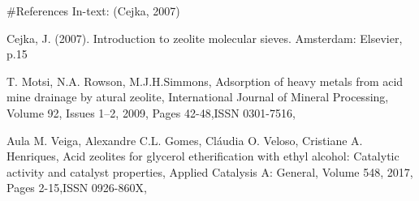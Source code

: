 \documentclass[]{article}
\begin{document}
\#References In-text: (Cejka, 2007)

Cejka, J. (2007). Introduction to zeolite molecular sieves. Amsterdam:
Elsevier, p.15

T. Motsi, N.A. Rowson, M.J.H.Simmons, Adsorption of heavy metals from
acid mine drainage by atural zeolite, International Journal of Mineral
Processing, Volume 92, Issues 1--2, 2009, Pages 42-48,ISSN 0301-7516,

Aula M. Veiga, Alexandre C.L. Gomes, Cláudia O. Veloso, Cristiane A.
Henriques, Acid zeolites for glycerol etherification with ethyl alcohol:
Catalytic activity and catalyst properties, Applied Catalysis A:
General, Volume 548, 2017, Pages 2-15,ISSN 0926-860X,
\end{document}
